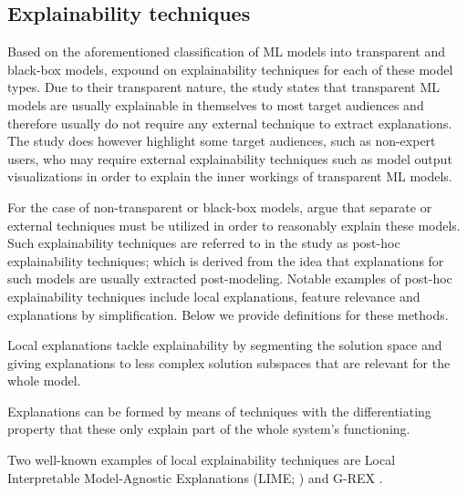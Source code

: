 \subsection{Explainability techniques}

\label{section:xai-techniques}

Based on the aforementioned classification of ML models into transparent and black-box models, \citet{arrieta2020explainable} expound on explainability techniques for each of these model types. Due to their transparent nature, the study states that transparent ML models are usually explainable in themselves to most target audiences and therefore usually do not require any external technique to extract explanations. The study does however highlight some target audiences, such as non-expert users, who may require external explainability techniques such as model output visualizations in order to explain the inner workings of transparent ML models.

For the case of non-transparent or black-box models, \citet{arrieta2020explainable} argue that separate or external techniques must be utilized in order to reasonably explain these models. Such explainability techniques are referred to in the study as post-hoc explainability techniques; which is derived from the idea that explanations for such models are usually extracted post-modeling. Notable examples of post-hoc explainability techniques include local explanations, feature relevance and explanations by simplification. Below we provide definitions for these methods.

\begin{definition}
  Local explanations tackle explainability by segmenting the solution space and giving explanations to less complex solution subspaces that are relevant for the whole model.
\end{definition}

\begin{remark}
Explanations can be formed by means of techniques with the differentiating property that these only explain part of the whole system’s functioning. 
\end{remark}

\begin{remark}
  Two well-known examples of local explainability techniques are Local Interpretable Model-Agnostic Explanations (LIME; \citealt{lime}) and G-REX \citep{konig2008g}.
\end{remark}

